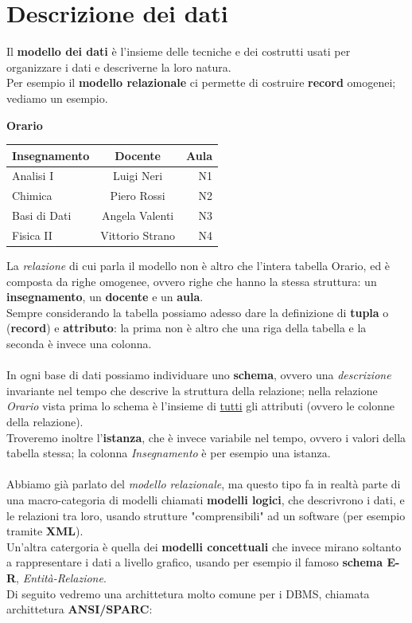 \section{Descrizione dei dati}
Il \textbf{modello dei dati} è l'insieme delle tecniche e 
dei costrutti usati per organizzare i dati e descriverne la loro natura. \\
Per esempio il \textbf{modello relazionale} ci permette di costruire 
\textbf{record} omogenei; vediamo un esempio.

\begin{center}
  \textbf{Orario} \\ \vspace{4px}
  \begin{tabular}{|l|c|r|}
    \hline
    Insegnamento & Docente & Aula \\ \hline
    Analisi I & Luigi Neri & N1 \\
    Chimica & Piero Rossi & N2 \\ 
    Basi di Dati & Angela Valenti & N3 \\
    Fisica II & Vittorio Strano & N4 \\ \hline
  \end{tabular}
\end{center}

La \emph{relazione} di cui parla il modello non è altro che l'intera 
tabella Orario, ed è composta da righe omogenee, ovvero righe che hanno
la stessa struttura: un \textbf{insegnamento}, un \textbf{docente} 
e un \textbf{aula}. \\
Sempre considerando la tabella possiamo adesso dare la definizione di 
\textbf{tupla} o (\textbf{record}) e \textbf{attributo}: la prima non 
è altro che una riga della tabella e la seconda è invece una colonna.
\\
\\
In ogni base di dati possiamo individuare uno \textbf{schema}, ovvero 
una \textit{descrizione} invariante nel tempo che descrive la struttura della
relazione; nella relazione \textit{Orario} vista prima lo schema è l'insieme
di \underline{tutti} gli attributi (ovvero le colonne della relazione). \\
Troveremo inoltre l'\textbf{istanza}, che è invece variabile nel tempo, ovvero
i valori della tabella stessa; la colonna \textit{Insegnamento} è per esempio una istanza.
\\
\\
Abbiamo già parlato del \textit{modello relazionale}, ma questo tipo fa in
realtà parte di una macro-categoria di modelli chiamati \textbf{modelli logici},
che descrivrono i dati, e le relazioni tra loro, usando strutture "comprensibili" 
ad un software (per esempio tramite \textbf{XML}). \\
Un'altra catergoria è quella dei \textbf{modelli concettuali} che invece mirano 
soltanto a rappresentare i dati a livello grafico, usando per esempio il famoso 
\textbf{schema E-R}, \textit{Entità-Relazione}. \\
Di seguito vedremo una archittetura molto comune per i DBMS, chiamata 
archittetura \textbf{ANSI/SPARC}:

